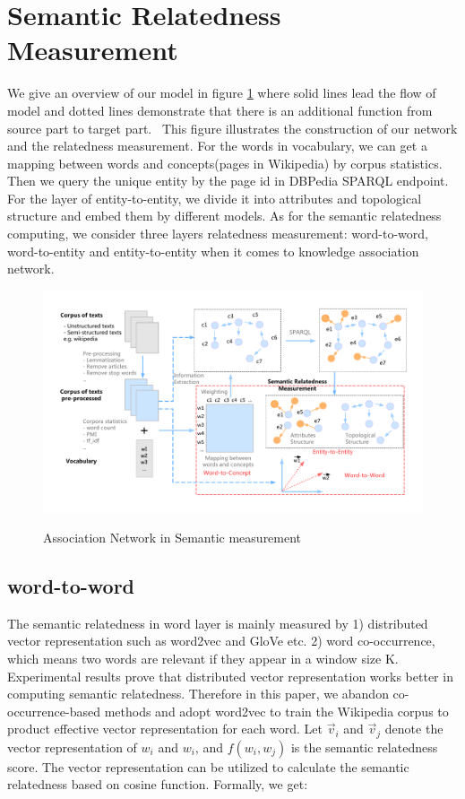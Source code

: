 \section{Semantic Relatedness Measurement}
\label{sr}
We give an overview of our model in figure \ref{overview} where solid lines lead the flow of model and dotted lines
demonstrate that there is an additional function from source part to target part. \
This figure illustrates the construction of our network and the relatedness measurement.
For the words in vocabulary, we can get a mapping between words and concepts(pages in Wikipedia)
by corpus statistics. Then we query the unique entity by the page id in DBPedia SPARQL endpoint.
For the layer of entity-to-entity, we divide it into attributes and topological structure and embed them by different models. 
As for the semantic relatedness computing, we consider three layers relatedness measurement:
word-to-word, word-to-entity and entity-to-entity when it comes to knowledge association network.

\begin{figure}
    \flushleft
    \includegraphics[width=1\textwidth]{pic/association-network.pdf}\\
    \caption{Association Network in Semantic measurement}
    \label{overview}
\end{figure}

\subsection{word-to-word}
The semantic relatedness in word layer is mainly measured by 1) distributed vector representation such as word2vec \cite{corr/Mikolov13} 
and GloVe \cite{emnlp/PenningtonSM14} etc. 2) word co-occurrence, which means two words are relevant if they appear in a window size K. 
Experimental results prove that distributed vector representation works better in computing semantic relatedness\cite{corr/Mikolov13}.
Therefore in this paper, we abandon co-occurrence-based methods and adopt word2vec to train the Wikipedia corpus to product effective
vector representation for each word. 
Let $\overrightarrow v_i$ and $\overrightarrow v_j$ denote the vector representation of $w_i$ and $w_i$, and $f(w_i, w_j)$ is the semantic
relatedness score. The vector representation can be utilized to calculate the semantic relatedness based on cosine
function. Formally, we get:

